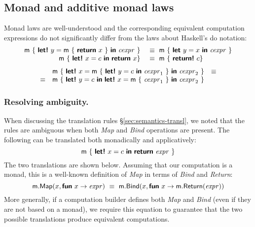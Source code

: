 \documentclass[runningheads,a4paper]{llncs}
\begin{document}

\subsection{Monad and additive monad laws}
\label{sec:laws-monads}

Monad laws are well-understood and the corresponding equivalent computation expressions do
not significantly differ from the laws about Haskell's do notation:
%
\begin{equation*}
\begin{array}{rl}
\ident{m}~\{~ \kvd{let!}~y=\ident{m}~\{~\kvd{return}~x~\}~\kvd{in}~\cexpr~ \}
&~\equiv~ \ident{m}~\{~ \kvd{let}~y=x~\kvd{in}~\cexpr~ \}
\\
\ident{m}~\{~ \kvd{let!}~x=c~\kvd{in}~\kvd{return}~x \}
&~\equiv~ \ident{m}~\{~ \kvd{return!}~c \}
\end{array}
\end{equation*}
\begin{equation*}
\begin{array}{rcl}
      &\ident{m}~\{~ \kvd{let!}~x=\ident{m}~\{~\kvd{let!}~y=c~\kvd{in}~\cexpr_1~\}~\kvd{in}~\cexpr_2~\}&\equiv\\
\equiv&\ident{m}~\{~ \kvd{let!}~y=c~\kvd{in}~\kvd{let!}~x=\ident{m}~\{~\cexpr_1~\}~\kvd{in}~\cexpr_2~\}\\
\end{array}
\end{equation*}

\vspace{-1em}
\subsubsection{Resolving ambiguity.} When discussing the translation rules 
\S\ref{sec:semantics-transl}, we noted that the rules are ambiguous when both \emph{Map} and
\emph{Bind} operations are present. The following can be translated both monadically and 
applicatively:
%
\begin{equation*}
\ident{m}~\{~\kvd{let!}~x = c~\kvd{in}~\kvd{return}~\expr~\}\\
\end{equation*}
%
The two translations are shown below. Assuming that our computation is a monad,
this is a well-known definition of \emph{Map} in terms of \emph{Bind} and \emph{Return}:
%
\begin{equation*}
\textnormal{\sffamily m}.\textnormal{\sffamily Map}(x, \textnormal{\bfseries\sffamily fun}~x \rightarrow \textnormal{\emph{expr}}) ~\equiv~
  \textnormal{\sffamily m}.\textnormal{\sffamily Bind}(x, \textnormal{\bfseries\sffamily fun}~x \rightarrow \textnormal{\sffamily m}.\textnormal{\sffamily Return}(\textnormal{\emph{expr}}))\\
\end{equation*}
%
More generally, if a computation builder defines both \emph{Map} and \emph{Bind} (even if they are
not based on a monad), we require this equation to guarantee that the two possible translations 
produce equivalent computations.
\end{document}
